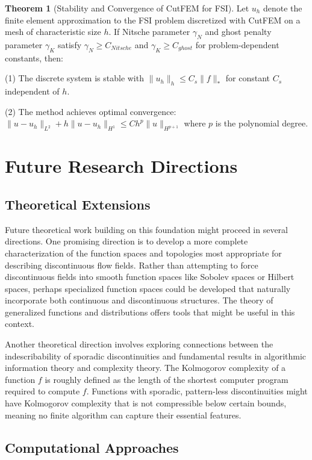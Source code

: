 ﻿\documentclass[a4paper,11pt]{article}
\theoremstyle{definition}
\newtheorem{theorem}{Theorem}
\begin{document}
\begin{theorem}[Stability and Convergence of CutFEM for FSI]
Let $u_h$ denote the finite element approximation to the FSI problem discretized with CutFEM on a mesh of characteristic size $h$. If Nitsche parameter $\gamma_N$ and ghost penalty parameter $\gamma_K$ satisfy $\gamma_N \geq C_{Nitsche}$ and $\gamma_K \geq C_{ghost}$ for problem-dependent constants, then:

(1) The discrete system is stable with $\|u_h\|_h \leq C_s \|f\|_*$ for constant $C_s$ independent of $h$.

(2) The method achieves optimal convergence: $\|u - u_h\|_{L^2} + h \|u - u_h\|_{H^1} \leq C h^p \|u\|_{H^{p+1}}$ where $p$ is the polynomial degree.
\end{theorem}

\section{Future Research Directions}

\subsection{Theoretical Extensions}

Future theoretical work building on this foundation might proceed in several directions. One promising direction is to develop a more complete characterization of the function spaces and topologies most appropriate for describing discontinuous flow fields. Rather than attempting to force discontinuous fields into smooth function spaces like Sobolev spaces or Hilbert spaces, perhaps specialized function spaces could be developed that naturally incorporate both continuous and discontinuous structures. The theory of generalized functions and distributions offers tools that might be useful in this context.

Another theoretical direction involves exploring connections between the indescribability of sporadic discontinuities and fundamental results in algorithmic information theory and complexity theory. The Kolmogorov complexity of a function $f$ is roughly defined as the length of the shortest computer program required to compute $f$. Functions with sporadic, pattern-less discontinuities might have Kolmogorov complexity that is not compressible below certain bounds, meaning no finite algorithm can capture their essential features.

\subsection{Computational Approaches}
\end{document}

